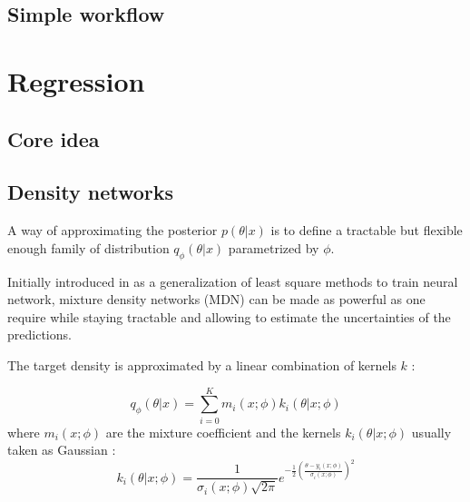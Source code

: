 \subsection{Simple workflow} %
\label{sub:simple_workflow}









\section{Regression} %
\label{sec:regression}









\subsection{Core idea} %
\label{sub:core_idea}




\subsection{Density networks} %
\label{sub:density_networks}


A way of approximating the posterior $p(\theta | x)$ is to define a tractable but flexible enough family of distribution $q_\phi(\theta | x)$ parametrized by $\phi$.

Initially introduced in \cite{Bishop94mixturedensity} as a generalization of least square methods to train neural network, mixture density networks (MDN) can be made as powerful as one require while staying tractable and allowing to estimate the uncertainties of the predictions.

The target density is approximated by a linear combination of kernels $k$ :

\begin{equation}
    q_\phi(\theta | x) = \sum_{i=0}^K m_i(x ; \phi) k_i(\theta | x ; \phi)
\end{equation}
where $m_i(x ; \phi)$ are the mixture coefficient
and the kernels $k_i(\theta | x ; \phi)$ usually taken as Gaussian :
\begin{equation}
    k_i(\theta | x ; \phi) = \frac{1}{\sigma_i(x ; \phi) \sqrt{2 \pi}} e^{- \frac{1}{2} \left ( \frac{\theta-y_i(x ; \phi)}{\sigma_i(x ; \phi)} \right )^2} 
\end{equation}

